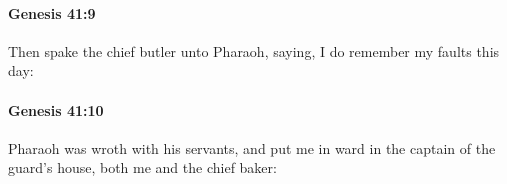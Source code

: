 		\paragraph{Genesis 41:9} %
			\label{GENESIS-41-9}

			Then spake the chief butler unto Pharaoh, saying, I do remember my faults this day:


		\paragraph{Genesis 41:10} %
			\label{GENESIS-41-10}

			Pharaoh was wroth with his servants, and put me in ward in the captain of the guard's house, both me and the chief baker:



